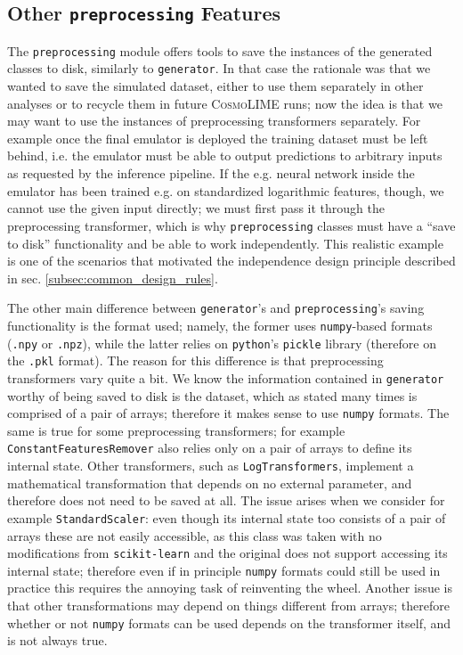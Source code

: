 \subsection{Other \texttt{preprocessing} Features}
The \texttt{preprocessing} module offers tools to save the instances of the generated classes to disk, similarly to \texttt{generator}. In that case the rationale was that we wanted to save the simulated dataset, either to use them separately in other analyses or to recycle them in future \textsc{CosmoLIME} runs; now the idea is that we may want to use the instances of preprocessing transformers separately. For example once the final emulator is deployed the training dataset must be left behind, i.e. the emulator must be able to output predictions to arbitrary inputs as requested by the inference pipeline. If the e.g. neural network inside the emulator has been trained e.g. on standardized logarithmic features, though, we cannot use the given input directly; we must first pass it through the preprocessing transformer, which is why \texttt{preprocessing} classes must have a ``save to disk'' functionality and be able to work independently.
This realistic example is one of the scenarios that motivated the independence design principle described in sec. \ref{subsec:common_design_rules}.

The other main difference between \texttt{generator}'s and \texttt{preprocessing}'s saving functionality is the format used; namely, the former uses \texttt{numpy}-based formats (\texttt{.npy} or \texttt{.npz}), while the latter relies on \texttt{python}'s \texttt{pickle} library (therefore on the \texttt{.pkl} format). The reason for this difference is that preprocessing transformers vary quite a bit. We know the information contained in \texttt{generator} worthy of being saved to disk is the dataset, which as stated many times is comprised of a pair of arrays; therefore it makes sense to use \texttt{numpy} formats.
The same is true for some preprocessing transformers; for example \texttt{ConstantFeaturesRemover} also relies only on a pair of arrays to define its internal state. Other transformers, such as \texttt{LogTransformers}, implement a mathematical transformation that depends on no external parameter, and therefore does not need to be saved at all.
The issue arises when we consider for example \texttt{StandardScaler}: even though its internal state too consists of a pair of arrays these are not easily accessible, as this class was taken with no modifications from \texttt{scikit-learn} and the original does not support accessing its internal state; therefore even if in principle \texttt{numpy} formats could still be used in practice this requires the annoying task of reinventing the wheel. Another issue is that other transformations may depend on things different from arrays; therefore whether or not \texttt{numpy} formats can be used depends on the transformer itself, and is not always true.

